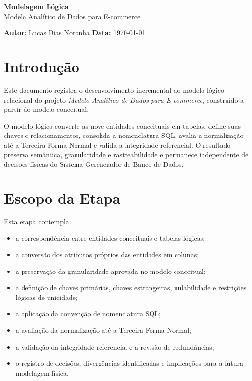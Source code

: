 \documentclass[12pt,a4paper]{article}
\newcommand{\projeto}{Modelo Analítico de Dados para E-commerce}
\newcommand{\autor}{Lucas Dias Noronha}
\newcommand{\dataDocumento}{\today}
\begin{document}
	\thispagestyle{empty}
	\vspace*{\fill}
	\begin{center}
		{\Huge \textcolor{AzulCorporativo}{\textbf{Modelagem Lógica}}}\\[0.5cm]
		{\Large \textcolor{AzulPetroleo}{\projeto}}\\[0.8cm]
	\end{center}
	\vspace*{\fill}
	\noindent
	\textbf{\textcolor{AzulCorporativo}{Autor:}} \autor
	\hfill
	\textbf{\textcolor{AzulCorporativo}{Data:}} \dataDocumento
	\newpage
	\setcounter{tocdepth}{1}
	\tableofcontents
	\newpage

	\section{Introdução}
	Este documento registra o desenvolvimento incremental do modelo lógico
	relacional do projeto \textit{\projeto}, construído a partir do modelo
	conceitual.

	O modelo lógico converte as nove entidades conceituais em tabelas, define suas
	chaves e relacionamentos, consolida a nomenclatura SQL, avalia a normalização
	até a Terceira Forma Normal e valida a integridade referencial. O resultado
	preserva semântica, granularidade e rastreabilidade e permanece independente de
	decisões físicas do Sistema Gerenciador de Banco de Dados.

	\section{Escopo da Etapa}
	Esta etapa contempla:
	\begin{itemize}[leftmargin=1.2cm]
		\item a correspondência entre entidades conceituais e tabelas lógicas;
		\item a conversão dos atributos próprios das entidades em colunas;
		\item a preservação da granularidade aprovada no modelo conceitual;
		\item a definição de chaves primárias, chaves estrangeiras, nulabilidade e
		restrições lógicas de unicidade;
		\item a aplicação da convenção de nomenclatura SQL;
		\item a avaliação da normalização até a Terceira Forma Normal;
		\item a validação da integridade referencial e a revisão de redundâncias;
		\item o registro de decisões, divergências identificadas e implicações para a futura modelagem física.
	\end{itemize}
\end{document}
